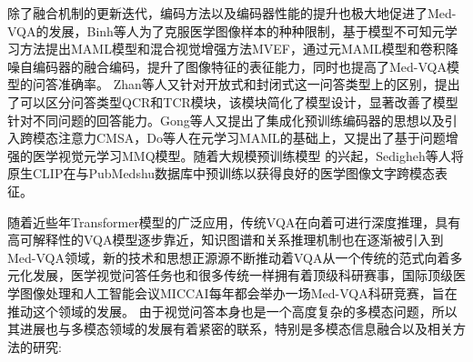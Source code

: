 除了融合机制的更新迭代，编码方法以及编码器性能的提升也极大地促进了Med-VQA的发展，Binh等人\cite{nguyen2019overcoming}为了克服医学图像样本的种种限制，基于模型不可知元学习方法提出MAML模型和混合视觉增强方法MVEF，通过元MAML模型和卷积降噪自编码器\cite{masci2011stacked}的融合编码，提升了图像特征的表征能力，同时也提高了Med-VQA模型的问答准确率。
Zhan等人\cite{zhan2020medical}又针对开放式和封闭式这一问答类型上的区别，提出了可以区分问答类型QCR和TCR模块，该模块简化了模型设计，显著改善了模型针对不同问题的回答能力。Gong等人\cite{gong2021cross}又提出了集成化预训练编码器的思想以及引入跨模态注意力CMSA，Do等人\cite{do2021multiple}在元学习MAML的基础上，又提出了基于问题增强的医学视觉元学习MMQ模型。随着大规模预训练模型
的兴起，Sedigheh等人\cite{eslami2021does}将原生CLIP在与PubMedshu数据库中预训练以获得良好的医学图像文字跨模态表征。

随着近些年Transformer模型\cite{vaswani2017attention}的广泛应用，传统VQA在向着可进行深度推理，具有高可解释性的VQA模型逐步靠近，知识图谱和关系推理机制也在逐渐被引入到Med-VQA领域\cite{chen2022align}，新的技术和思想正源源不断推动着VQA从一个传统的范式向着多元化发展\cite{lin2021medical}，医学视觉问答任务也和很多传统一样拥有着顶级科研赛事，国际顶级医学图像处理和人工智能会议MICCAI每年都会举办一场Med-VQA科研竞赛\cite{ben2021overview}，旨在推动这个领域的发展。
由于视觉问答本身也是一个高度复杂的多模态问题，所以其进展也与多模态领域的发展有着紧密的联系，特别是多模态信息融合以及相关方法的研究\cite{ngiam2011multimodal}:

